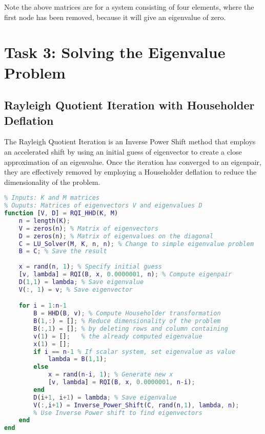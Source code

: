 \documentclass[11pt,oneside]{article}
\begin{document}
Note the above matrices are for a system consisting of four elements, where the first node has been removed, because it will give an eigenvalue of zero. 

\section*{Task 3: Solving the Eigenvalue Problem}

\subsection*{Rayleigh Quotient Iteration with Householder Deflation}

The Rayleigh Quotient Iteration is an Inverse Power Shift method that employs an accelerated shift by using an initial guess of eigenvector to create a close approximation of an eigenvalue. Once the iteration has converged to an eigenpair, they are effectively removed by employing a Householder deflation to reduce the dimensionality of the problem.

\begin{lstlisting}[language=Matlab]
%% Function to compute eigenvalues and eigenvectors
% Inputs: K and M matrices
% Ouputs: Matrices of eigenvectors V and eigenvalues D
function [V, D] = RQI_HHD(K, M)
    n = length(K);
    V = zeros(n); % Matrix of eigenvectors
    D = zeros(n); % Matrix of eigenvalues on the diagonal
    C = LU_Solver(M, K, n, n); % Change to simple eigenvalue problem
    B = C; % Save the result
    
    x = rand(n, 1); % Specify initial guess
    [v, lambda] = RQI(B, x, 0.0000001, n); % Compute eigenpair
    D(1,1) = lambda; % Save eigenvalue
    V(:, 1) = v; % Save eigenvector

    for i = 1:n-1
        B = HHD(B, v); % Compute Householder transformation
        B(1,:) = []; % Reduce dimensionality of the problem
        B(:,1) = []; % by deleting rows and column containing
        v(1) = [];   % the already computed eigenvalue
        x(1) = [];
        if i == n-1 % If scalar system, set eigenvalue as value
            lambda = B(1,1);
        else
            x = rand(n-i, 1); % Generate new x
            [v, lambda] = RQI(B, x, 0.0000001, n-i);
        end
        D(i+1, i+1) = lambda; % Save eigenvalue
        V(:,i+1) = Inverse_Power_Shift(C, rand(n,1), lambda, n);
        % Use Inverse Power shift to find eigenvectors
    end
end
\end{lstlisting}
\end{document}
